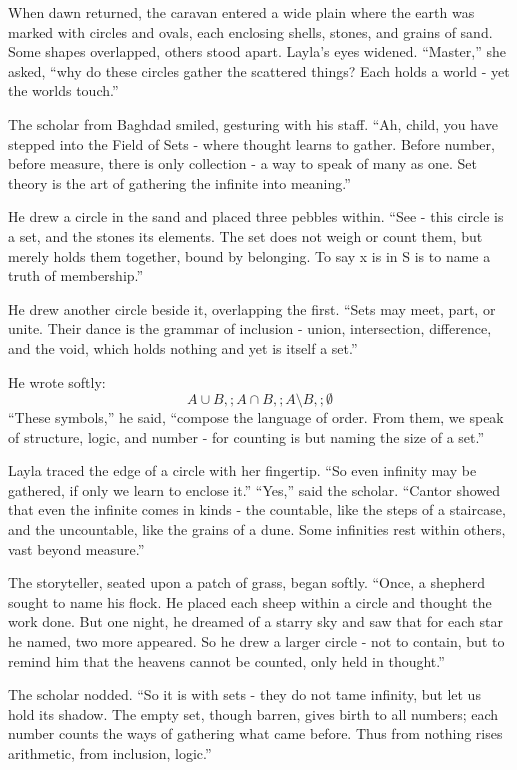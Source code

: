 \documentclass[
  letterpaper,
  DIV=11,
  numbers=noendperiod]{scrreprt}
\begin{document}
When dawn returned, the caravan entered a wide plain where the earth was
marked with circles and ovals, each enclosing shells, stones, and grains
of sand. Some shapes overlapped, others stood apart. Layla's eyes
widened. ``Master,'' she asked, ``why do these circles gather the
scattered things? Each holds a world - yet the worlds touch.''

The scholar from Baghdad smiled, gesturing with his staff. ``Ah, child,
you have stepped into the Field of Sets - where thought learns to
gather. Before number, before measure, there is only collection - a way
to speak of many as one. Set theory is the art of gathering the infinite
into meaning.''

He drew a circle in the sand and placed three pebbles within. ``See -
this circle is a set, and the stones its elements. The set does not
weigh or count them, but merely holds them together, bound by belonging.
To say x is in S is to name a truth of membership.''

He drew another circle beside it, overlapping the first. ``Sets may
meet, part, or unite. Their dance is the grammar of inclusion - union,
intersection, difference, and the void, which holds nothing and yet is
itself a set.''

He wrote softly: \[
A \cup B,; A \cap B,; A \setminus B,; \emptyset
\] ``These symbols,'' he said, ``compose the language of order. From
them, we speak of structure, logic, and number - for counting is but
naming the size of a set.''

Layla traced the edge of a circle with her fingertip. ``So even infinity
may be gathered, if only we learn to enclose it.'' ``Yes,'' said the
scholar. ``Cantor showed that even the infinite comes in kinds - the
countable, like the steps of a staircase, and the uncountable, like the
grains of a dune. Some infinities rest within others, vast beyond
measure.''

The storyteller, seated upon a patch of grass, began softly. ``Once, a
shepherd sought to name his flock. He placed each sheep within a circle
and thought the work done. But one night, he dreamed of a starry sky and
saw that for each star he named, two more appeared. So he drew a larger
circle - not to contain, but to remind him that the heavens cannot be
counted, only held in thought.''

The scholar nodded. ``So it is with sets - they do not tame infinity,
but let us hold its shadow. The empty set, though barren, gives birth to
all numbers; each number counts the ways of gathering what came before.
Thus from nothing rises arithmetic, from inclusion, logic.''
\end{document}
